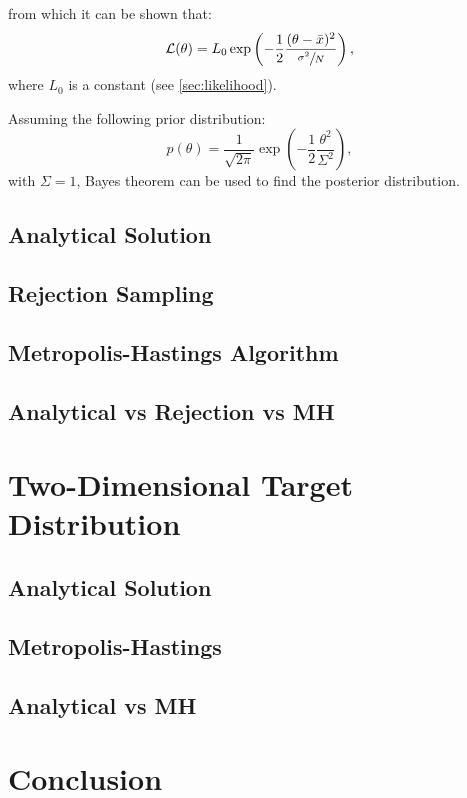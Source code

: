 \documentclass[a4paper,11pt,twoside]{article}
\begin{document}
from which it can be shown that:
\begin{equation}
	\label{eq:likelihood}
	\mathcal{L}(\theta) = L_0\exp\left(-\frac{1}{2}\frac{(\theta - \bar{x})^2}{\sfrac{\sigma^2}{N}}\right),
\end{equation}
where $L_0$ is a constant (see \cref{sec:likelihood}).

Assuming the following prior distribution:
\begin{equation}
	\label{eq:prior}
	p(\theta) =  \frac{1}{\sqrt{2\pi}}\exp\left(-\frac{1}{2}\frac{\theta^2}{\Sigma^2}\right),
\end{equation}
with $\Sigma = 1$, Bayes theorem can be used to find the posterior distribution.
\subsection{Analytical Solution}
\subsection{Rejection Sampling} 
\subsection{Metropolis-Hastings Algorithm} 
\subsection{Analytical vs Rejection vs MH}

\section{Two-Dimensional Target Distribution} 
\subsection{Analytical Solution}
\subsection{Metropolis-Hastings} 
\subsection{Analytical vs MH}

\section{Conclusion}

\appendix 
\label{appendix}
\end{document}
